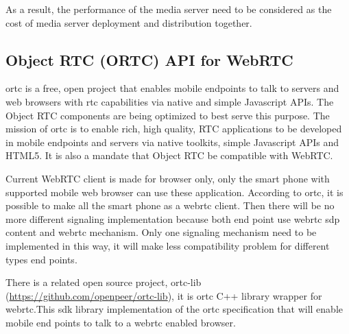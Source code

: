 \par As a result, the performance of the media server need to be considered as the cost of media server deployment and distribution together.

\subsection{Object RTC (ORTC) API for WebRTC}

\par \gls{ortc} is a free, open project that enables mobile endpoints to talk to servers and web browsers with \gls{rtc} capabilities via native and simple Javascript APIs. The Object RTC components are being optimized to best serve this purpose.\cite{website:ortc} The mission of \gls{ortc} is to enable rich, high quality, RTC applications to be developed in mobile endpoints and servers via native toolkits, simple Javascript APIs and HTML5. It is also a mandate that Object RTC be compatible with WebRTC.

\par Current WebRTC client is made for browser only, only the smart phone with supported mobile web browser can use these application. According to \gls{ortc}, it is possible to make all the smart phone as a \gls{webrtc} client. Then there will be no more different signaling implementation because both end point use \gls{webrtc} \gls{sdp} content and \gls{webrtc} mechanism. Only one signaling mechanism need to be implemented in this way, it will make less compatibility problem for different types end points.

\par There is a related open source project, ortc-lib (\url{https://github.com/openpeer/ortc-lib}), it is \gls{ortc} C++ library wrapper for \gls{webrtc}.This \gls{sdk} library implementation of the \gls{ortc} specification that will enable mobile end points to talk to a \gls{webrtc} enabled browser.

